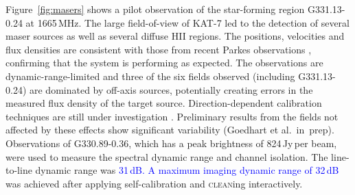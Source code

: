 Figure~\ref{fig:masers} shows a pilot observation of the star-forming
region \mbox{G331.13-0.24} at 1665\,MHz. The large field-of-view of KAT-7 led
to the detection of several maser sources as well as several diffuse
HII regions. The positions, velocities and flux densities are
consistent with those from recent Parkes observations
\citep{caswell14}, confirming that the system is performing as
expected.  The observations are dynamic-range-limited and three of the
six fields observed (including \mbox{G331.13-0.24}) are dominated by off-axis
sources, potentially creating errors in the measured flux density of
the target source.  Direction-dependent calibration techniques are
still under investigation \citep{bhat}. Preliminary results from the
fields not affected by these effects show significant variability
(Goedhart et al.~in~prep). Observations of \mbox{G330.89-0.36}, which has a
peak brightness of 824\,Jy\,per beam, were used to measure the spectral
dynamic range and channel isolation. The line-to-line dynamic range
was \textcolor{blue}{31\,dB. A maximum imaging dynamic range of 32\,dB} was
achieved after applying self-calibration and \textsc{clean}ing
interactively.



\iffalse 
\subsection{HI Intensity Mapping}
\noindent
In cosmology, intensity mapping of the HI spectral line is an
observation technique used for surveying the large-scale structure of
the universe (see e.g.~\citealt{bull}). By mapping the distributions
of neutral hydrogen gas in nearby galaxies astronomers are able to
model the dark matter distribution of each galaxy.

KAT-7 records both single-dish (auto-correlation) data as well as
interferometric (cross-correlation) products. Auto-correlation data
can be used for creating the large-scale high-resolution maps, while
the interferometric data allows for the removal of systematic errors
through calibration.

This implementation of combined single dish and interferometric data
has been identified as a possible observation mode for improved
detection of the Baryon Acoustic Oscillation (BAO) feature and KAT-7
may be used as a proof of concept for
future HI intensity mapping surveys (see \citealt{bull}). 
\fi

